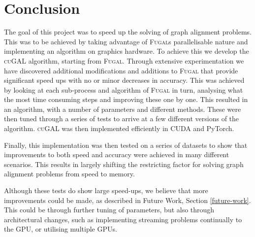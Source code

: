 
\section{Conclusion}
The goal of this project was to speed up the solving of graph alignment problems. This was to be achieved by taking advantage of \textsc{Fugal}s parallelisable nature and implementing an algorithm on graphics hardware. To achieve this we develop the \textsc{cuGAL} algorithm, starting from \textsc{Fugal}. Through extensive experimentation we have discovered additional modifications and additions to \textsc{Fugal} that provide significant speed ups with no or minor decreases in accuracy. This was achieved by looking at each sub-process and algorithm of \textsc{Fugal} in turn, analysing what the most time consuming steps and improving these one by one. This resulted in an algorithm, with a number of parameters and different methods. These were then tuned through a series of tests to arrive at a few different versions of the algorithm. \textsc{cuGAL} was then implemented efficiently in CUDA and PyTorch.

Finally, this implementation was then tested on a series of datasets to show that improvements to both speed and accuracy were achieved in many different scenarios. This results in largely shifting the restricting factor for solving graph alignment problems from speed to memory. 

Although these tests do show large speed-ups, we believe that more improvements could be made, as described in Future Work, Section \ref{future-work}. This could be through further tuning of parameters, but also through architectural changes, such as implementing streaming problems continually to the GPU, or utilising multiple GPUs. 